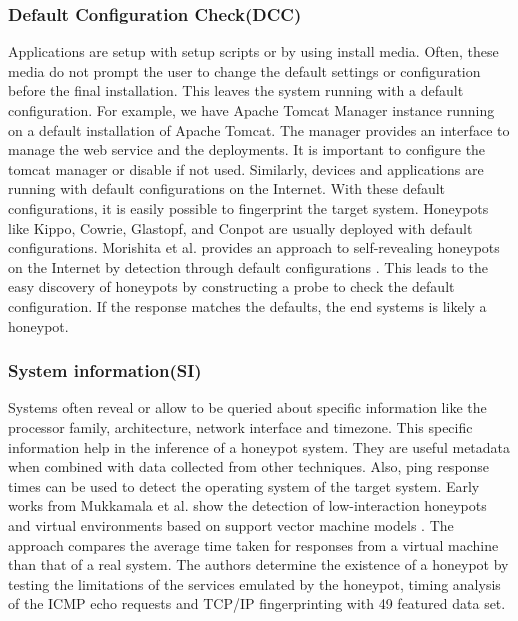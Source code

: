 \subsubsection{Default Configuration Check(DCC)}
Applications are setup with setup scripts or by using install media. Often, these media do not prompt the user to change the default settings or configuration before the final installation. This leaves the system running with a default configuration. For example, we have Apache Tomcat Manager instance running on a default installation of Apache Tomcat. The manager provides an interface to manage the web service and the deployments. It is important to configure the tomcat manager or disable if not used. Similarly, devices and applications are running with default configurations on the Internet. With these default configurations, it is easily possible to fingerprint the target system. Honeypots like Kippo, Cowrie, Glastopf, and Conpot are usually deployed with default configurations. Morishita et al.  provides an approach to self-revealing honeypots on the Internet by detection through default configurations \cite{morishita}.  This leads to the easy discovery of honeypots by constructing a probe to check the default configuration. If the response matches the defaults, the end systems is likely a honeypot.
\newline
\subsubsection{System information(SI)}
Systems often reveal or allow to be queried about specific information like the processor family, architecture, network interface and timezone. This specific information help in the inference of a honeypot system. They are useful metadata when combined with data collected from other techniques.  Also, ping response times can be used to detect the operating system of the target system. Early works from Mukkamala et al.  show the detection of low-interaction honeypots and virtual environments based on support vector machine models \cite{mukkamala}. The approach compares the average time taken for responses from a virtual machine than that of a real system. The authors determine the existence of a honeypot by testing the limitations of the services emulated by the honeypot, timing analysis of the ICMP echo requests and TCP/IP fingerprinting with 49 featured data set.  
\newline
